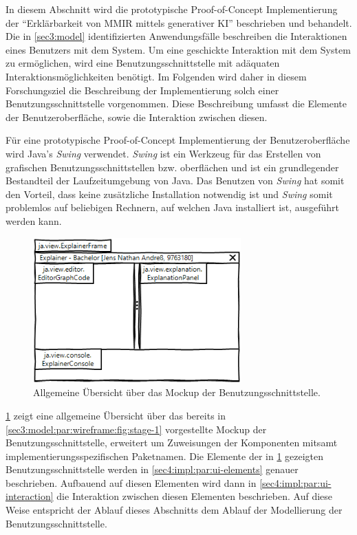In diesem Abschnitt wird die prototypische Proof-of-Concept Implementierung der \enquote{Erklärbarkeit von MMIR mittels generativer KI} beschrieben und behandelt.
Die in \cref{sec3:model} identifizierten Anwendungsfälle beschreiben die Interaktionen eines Benutzers mit dem System.
Um eine geschickte Interaktion mit dem System zu ermöglichen, wird eine Benutzungsschnittstelle mit adäquaten Interaktionsmöglichkeiten benötigt.
Im Folgenden wird daher in diesem Forschungsziel die Beschreibung der Implementierung solch einer Benutzungsschnittstelle vorgenommen.
Diese Beschreibung umfasst die Elemente der Benutzeroberfläche, sowie die Interaktion zwischen diesen.

Für eine prototypische Proof-of-Concept Implementierung der Benutzeroberfläche wird Java's \textit{Swing} verwendet.
\textit{Swing} ist ein Werkzeug für das Erstellen von grafischen Benutzungsschnittstellen bzw. oberflächen und ist ein grundlegender Bestandteil der Laufzeitumgebung von Java.
Das Benutzen von \textit{Swing} hat somit den Vorteil, dass keine zusätzliche Installation notwendig ist und \textit{Swing} somit problemlos auf beliebigen Rechnern, auf welchen Java installiert ist, ausgeführt werden kann.
\begin{figure}[!ht]
  \includegraphics[width=8cm]{chapter/chapter_4/wireframe-impl-overview}
  \caption{Allgemeine Übersicht über das Mockup der Benutzungsschnittstelle.}
  \label{sec4:impl:subsubsec:ui:fig:wireframe-overview}
\end{figure}
\cref{sec4:impl:subsubsec:ui:fig:wireframe-overview} zeigt eine allgemeine Übersicht über das bereits in \cref{sec3:model:par:wireframe:fig:stage-1} vorgestellte Mockup der Benutzungsschnittstelle, erweitert um Zuweisungen der Komponenten mitsamt implementierungsspezifischen Paketnamen.
Die Elemente der in \cref{sec4:impl:subsubsec:ui:fig:wireframe-overview} gezeigten Benutzungsschnittstelle werden in \cref{sec4:impl:par:ui-elements} genauer beschrieben.
Aufbauend auf diesen Elementen wird dann in \cref{sec4:impl:par:ui-interaction} die Interaktion zwischen diesen Elementen beschrieben.
Auf diese Weise entspricht der Ablauf dieses Abschnitts dem Ablauf der Modellierung der Benutzungsschnittstelle.

